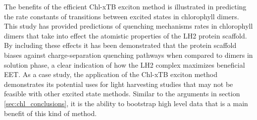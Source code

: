 The benefits of the efficient Chl-xTB exciton method is illustrated in predicting
the rate constants of transitions between excited states in chlorophyll dimers. 
This study has provided  predictions of quenching mechanisms rates in chlorophyll
dimers that take into effect the atomistic properties of the LH2 protein scaffold.
By including these effects it has been demonstrated that the protein scaffold biases 
against charge-separation quenching pathways when compared to dimers in solution
phase, a clear indication of how the LH2 complex maximizes beneficial EET. As a 
case study, the application of the Chl-xTB exciton method demonstrates its potential
uses for light harvesting studies that may not be feasible with other excited state
methods. Similar to the arguments in section \ref{sec:chl_conclusions}, it is the 
ability to bootstrap high level data that is a main benefit of this kind of method.
